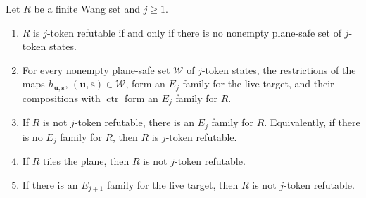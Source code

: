 \begin{theorem}\label{thm:game}
Let $R$ be a finite Wang set and $j\ge1$.
\begin{enumerate}
\item[(i)] $R$ is $j$-token refutable if and only if there is no nonempty plane-safe set of $j$-token states.
\item[(ii)] For every nonempty plane-safe set $\mathcal W$ of $j$-token states, the restrictions of the maps $h_{\mathbf u,\mathbf s}$, $(\mathbf u,\mathbf s)\in\mathcal W$, form an $E_j$ family for the live target, and their compositions with $\operatorname{ctr}$ form an $E_j$ family for $R$.
\item[(iii)] If $R$ is not $j$-token refutable, there is an $E_j$ family for $R$. Equivalently, if there is no $E_j$ family for $R$, then $R$ is $j$-token refutable.
\item[(iv)] If $R$ tiles the plane, then $R$ is not $j$-token refutable.
\item[(v)] If there is an $E_{j+1}$ family for the live target, then $R$ is not $j$-token refutable.
\end{enumerate}
\end{theorem}

